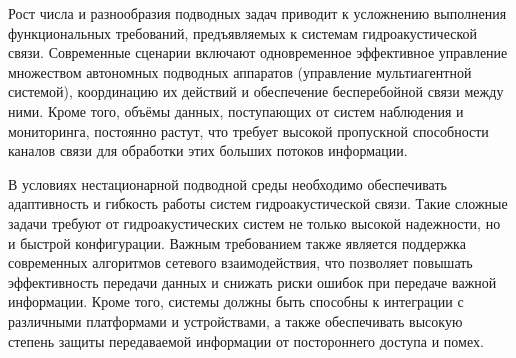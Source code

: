 \documentclass[
    numbers=section,
    document-code={ВКРБ--09.03.04--10.19--XX--26--81}
]{../latex/fqw}
\begin{document}
    Рост числа и разнообразия подводных задач приводит к усложнению выполнения функциональных требований,
    предъявляемых к системам гидроакустической связи.
    Современные сценарии включают одновременное эффективное управление множеством автономных подводных аппаратов\nbspace
    \cite{akyildizUnderwaterAcousticSensor2005} (управление мультиагентной системой), координацию их действий и
    обеспечение бесперебойной связи между ними.
    Кроме того, объёмы данных, поступающих от систем наблюдения и мониторинга, постоянно растут, что требует высокой
    пропускной способности каналов связи для обработки этих больших потоков информации.

    В условиях нестационарной подводной среды необходимо обеспечивать адаптивность и гибкость работы систем
    гидроакустической связи.
    Такие сложные задачи требуют от гидроакустических систем не только высокой надежности, но и быстрой конфигурации.
    Важным требованием также является поддержка современных алгоритмов сетевого взаимодействия,
    что позволяет повышать эффективность передачи данных и снижать риски ошибок при передаче важной информации.
    Кроме того, системы должны быть способны к интеграции с различными платформами и устройствами,
    а также обеспечивать высокую степень защиты передаваемой информации от постороннего доступа и помех.
\end{document}

